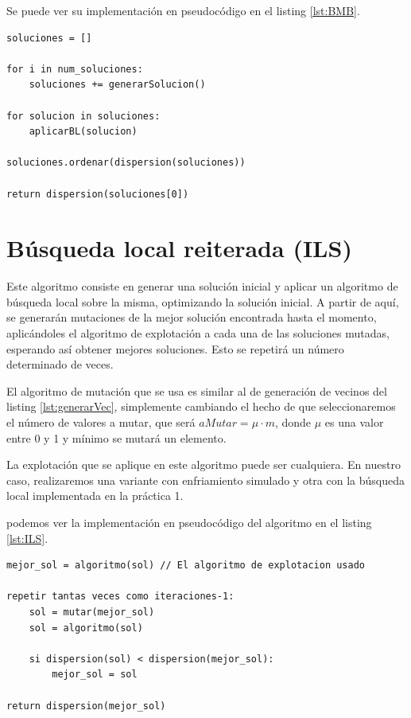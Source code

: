 Se puede ver su implementación en pseudocódigo en el listing \ref{lst:BMB}.

\begin{lstlisting}[frame=single, caption={Búsqueda multiarranque básica}, captionpos=b, label=lst:BMB]
soluciones = []

for i in num_soluciones:
    soluciones += generarSolucion()

for solucion in soluciones:
    aplicarBL(solucion)

soluciones.ordenar(dispersion(soluciones))

return dispersion(soluciones[0])
\end{lstlisting}


\section{Búsqueda local reiterada (ILS)}

Este algoritmo consiste en generar una solución inicial y aplicar un algoritmo de búsqueda local sobre la misma, optimizando la solución inicial. A partir de aquí, se generarán mutaciones de la mejor solución encontrada hasta el momento, aplicándoles el algoritmo de explotación a cada una de las soluciones mutadas, esperando así obtener mejores soluciones.
Esto se repetirá un número determinado de veces.

El algoritmo de mutación que se usa es similar al de generación de vecinos del listing \ref{lst:generarVec}, simplemente cambiando el hecho de que seleccionaremos el número de valores a mutar, que será $aMutar = \mu \cdot m$, donde $\mu$ es una valor entre 0 y 1 y mínimo se mutará un elemento.

La explotación que se aplique en este algoritmo puede ser cualquiera. En nuestro caso, realizaremos una variante con enfriamiento simulado y otra con la búsqueda local implementada en la práctica 1.

podemos ver la implementación en pseudocódigo del algoritmo en el listing \ref{lst:ILS}.

\begin{lstlisting}[frame=single, caption={Búsqueda local reiterada}, captionpos=b, label=lst:ILS]
mejor_sol = algoritmo(sol) // El algoritmo de explotacion usado

repetir tantas veces como iteraciones-1:
    sol = mutar(mejor_sol)
    sol = algoritmo(sol)
    
    si dispersion(sol) < dispersion(mejor_sol):
        mejor_sol = sol

return dispersion(mejor_sol)
\end{lstlisting}

